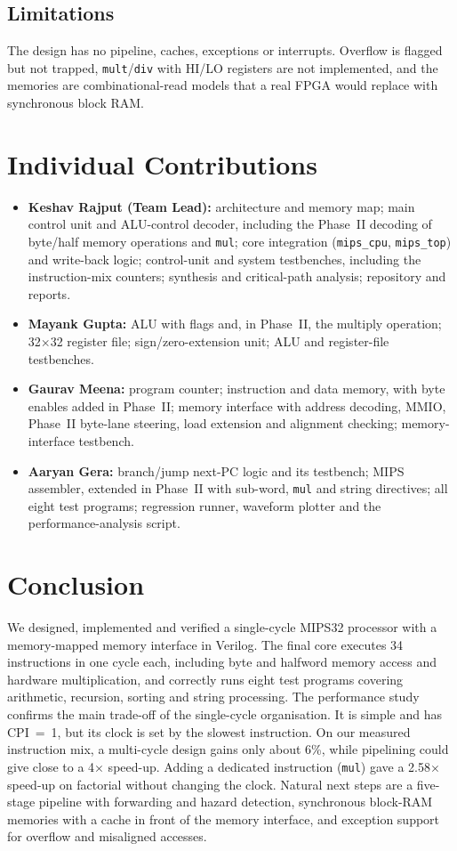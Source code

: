 \documentclass[conference]{IEEEtran}
\begin{document}
\subsection{Limitations}
The design has no pipeline, caches, exceptions or interrupts. Overflow is flagged but not trapped, \texttt{mult}/\texttt{div} with HI/LO registers are not implemented, and the memories are combinational-read models that a real FPGA would replace with synchronous block RAM.

\section{Individual Contributions}
\begin{itemize}
\item \textbf{Keshav Rajput (Team Lead):} architecture and memory map; main control unit and ALU-control decoder, including the Phase~II decoding of byte/half memory operations and \texttt{mul}; core integration (\texttt{mips\_cpu}, \texttt{mips\_top}) and write-back logic; control-unit and system testbenches, including the instruction-mix counters; synthesis and critical-path analysis; repository and reports.
\item \textbf{Mayank Gupta:} ALU with flags and, in Phase~II, the multiply operation; 32$\times$32 register file; sign/zero-extension unit; ALU and register-file testbenches.
\item \textbf{Gaurav Meena:} program counter; instruction and data memory, with byte enables added in Phase~II; memory interface with address decoding, MMIO, Phase~II byte-lane steering, load extension and alignment checking; memory-interface testbench.
\item \textbf{Aaryan Gera:} branch/jump next-PC logic and its testbench; MIPS assembler, extended in Phase~II with sub-word, \texttt{mul} and string directives; all eight test programs; regression runner, waveform plotter and the performance-analysis script.
\end{itemize}

\section{Conclusion}
We designed, implemented and verified a single-cycle MIPS32 processor with a memory-mapped memory interface in Verilog. The final core executes 34 instructions in one cycle each, including byte and halfword memory access and hardware multiplication, and correctly runs eight test programs covering arithmetic, recursion, sorting and string processing. The performance study confirms the main trade-off of the single-cycle organisation. It is simple and has CPI~=~1, but its clock is set by the slowest instruction. On our measured instruction mix, a multi-cycle design gains only about 6\%, while pipelining could give close to a 4$\times$ speed-up. Adding a dedicated instruction (\texttt{mul}) gave a 2.58$\times$ speed-up on factorial without changing the clock. Natural next steps are a five-stage pipeline with forwarding and hazard detection, synchronous block-RAM memories with a cache in front of the memory interface, and exception support for overflow and misaligned accesses.
\end{document}
